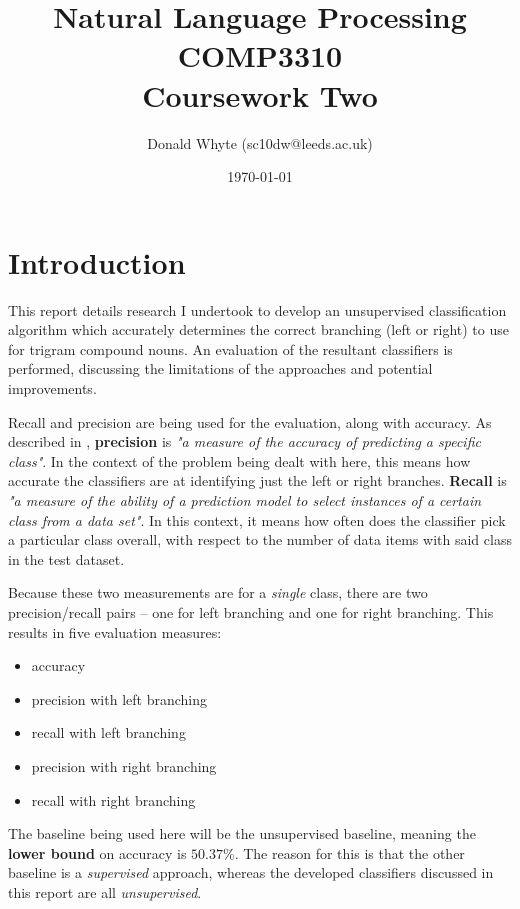 \documentclass{article}
\title{Natural Language Processing \\ COMP3310 \\ Coursework Two}
\author{Donald Whyte (sc10dw@leeds.ac.uk)}
\date{\today}
\begin{document}
\lstset{language=Python}
\lstset{basicstyle=\ttfamily}

\maketitle

\section{Introduction}

This report details research I undertook to develop an unsupervised classification algorithm which accurately determines the correct branching (left or right) to use for trigram compound nouns. An evaluation of the resultant classifiers is performed, discussing the limitations of the approaches and potential improvements.

Recall and precision are being used for the evaluation, along with accuracy. As described in \cite{classification-evaluation}, \textbf{precision} is \textit{"a measure of the accuracy of predicting a specific class"}. In the context of the problem being dealt with here, this means how accurate the classifiers are at identifying just the left or right branches. \textbf{Recall} is \textit{"a measure of the ability of a prediction model to select instances of a certain class from a data set"}. In this context, it means how often does the classifier pick a particular class overall, with respect to the number of data items with said class in the test dataset.

Because these two measurements are for a \textit{single} class, there are two precision/recall pairs -- one for left branching and one for right branching. This results in five evaluation measures:
\begin{itemize}
	\item accuracy
	\item precision with left branching
	\item recall with left branching
	\item precision with right branching
	\item recall with right branching	
\end{itemize}

The baseline being used here will be the unsupervised baseline, meaning the \textbf{lower bound} on accuracy is $50.37\%$. The reason for this is that the other baseline is a \textit{supervised} approach, whereas the developed classifiers discussed in this report are all \textit{unsupervised}.
\end{document}
